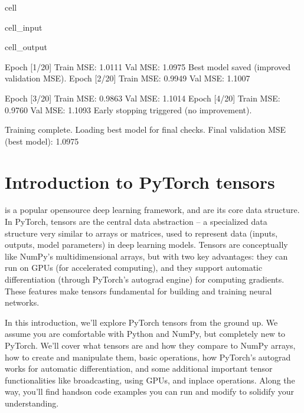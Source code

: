 \documentclass[letterpaper,10pt,english]{jupyterBook}
\begin{document}
\begin{sphinxuseclass}{cell}
\begin{sphinxVerbatimInput}
\begin{sphinxuseclass}{cell_input}
\end{sphinxuseclass}\end{sphinxVerbatimInput}
\begin{sphinxVerbatimOutput}

\begin{sphinxuseclass}{cell_output}
\begin{sphinxVerbatim}[commandchars=\\\{\}]
Epoch [1/20]  Train MSE: 1.0111  Val MSE: 1.0975
  Best model saved (improved validation MSE).
Epoch [2/20]  Train MSE: 0.9949  Val MSE: 1.1007
\end{sphinxVerbatim}

\begin{sphinxVerbatim}[commandchars=\\\{\}]
Epoch [3/20]  Train MSE: 0.9863  Val MSE: 1.1014
Epoch [4/20]  Train MSE: 0.9760  Val MSE: 1.1093
Early stopping triggered (no improvement).

Training complete. Loading best model for final checks.
Final validation MSE (best model): 1.0975
\end{sphinxVerbatim}

\end{sphinxuseclass}\end{sphinxVerbatimOutput}

\end{sphinxuseclass}

\section{Introduction to PyTorch tensors}
\label{\detokenize{04:introduction-to-pytorch-tensors}}
\sphinxAtStartPar
{} is a popular open\sphinxhyphen{}source deep learning framework, and  are its core data structure. In PyTorch, tensors are the central data abstraction – a specialized data structure very similar to arrays or matrices, used to represent data (inputs, outputs, model parameters) in deep learning models. Tensors are conceptually like NumPy’s multi\sphinxhyphen{}dimensional arrays, but with two key advantages: they can run on GPUs (for accelerated computing), and they support automatic differentiation (through PyTorch’s autograd engine) for computing gradients. These features make tensors fundamental for building and training neural networks.

\sphinxAtStartPar
In this introduction, we’ll explore PyTorch tensors from the ground up. We assume you are comfortable with Python and NumPy, but completely new to PyTorch. We’ll cover what tensors are and how they compare to NumPy arrays, how to create and manipulate them, basic operations, how PyTorch’s autograd works for automatic differentiation, and some additional important tensor functionalities like broadcasting, using GPUs, and in\sphinxhyphen{}place operations. Along the way, you’ll find hands\sphinxhyphen{}on code examples you can run and modify to solidify your understanding.
\end{document}

